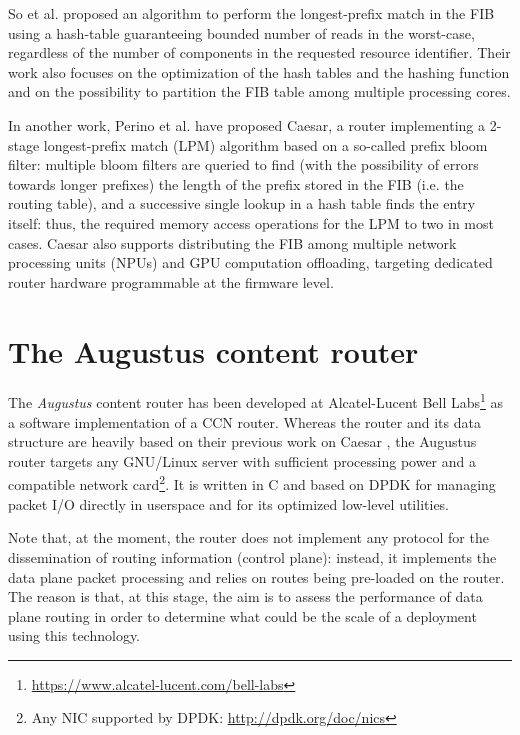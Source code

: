 \documentclass[11pt,a4paper,twoside,titlepage,openany]{book}
\begin{document}
So et al. \cite{ndn_fast_dosresistant} proposed an algorithm to perform the longest-prefix match in the \gls{FIB} using a hash-table guaranteeing bounded number of reads in the worst-case, regardless of the number of components in the requested resource identifier. Their work also focuses on the optimization of the hash tables and the hashing function and on the possibility to partition the \gls{FIB} table among multiple processing cores.

In another work, Perino et al. \cite{caesar} have proposed Caesar, a router implementing a 2-stage longest-prefix match (LPM) algorithm based on a so-called prefix bloom filter: multiple bloom filters are queried to find (with the possibility of errors towards longer prefixes) the length of the prefix stored in the \gls{FIB} (i.e. the routing table), and a successive single lookup in a hash table finds the entry itself: thus, the required memory access operations for the LPM to two in most cases. Caesar also supports distributing the \gls{FIB} among multiple network processing units (NPUs) and GPU computation offloading, targeting dedicated router hardware programmable at the firmware level.



\chapter{The Augustus content router}
\label{chap:augustus}

The \emph{Augustus} content router has been developed at Alcatel-Lucent Bell Labs\footnote{\url{https://www.alcatel-lucent.com/bell-labs}} as a software implementation of a \gls{CCN} router.
Whereas the router and its data structure are heavily based on their previous work on Caesar \cite{caesar}, the Augustus router targets any GNU/Linux server with sufficient processing power and a compatible network card\footnote{Any NIC supported by DPDK: \url{http://dpdk.org/doc/nics}}. It is written in C and based on DPDK \cite{dpdk} for managing packet I/O directly in userspace and for its optimized low-level utilities.

Note that, at the moment, the router does not implement any protocol for the dissemination of routing information (control plane): instead, it implements the data plane packet processing and relies on routes being pre-loaded on the router. The reason is that, at this stage, the aim is to assess the performance of data plane routing in order to determine what could be the scale of a deployment using this technology.
\end{document}
